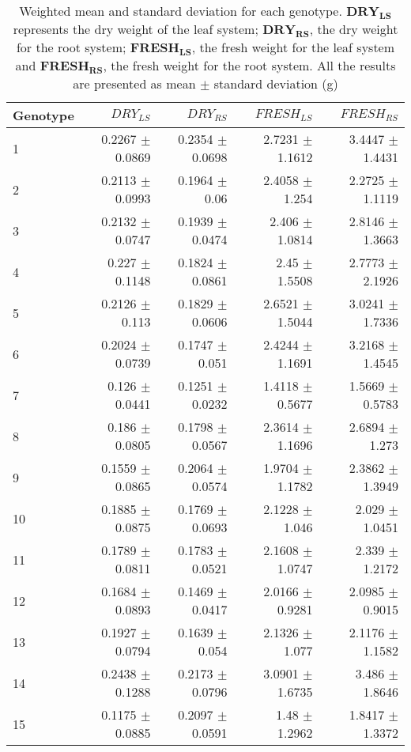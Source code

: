 \begin{table}[ht]
\centering
\caption{Weighted mean and standard deviation for each genotype. $\mathbf{DRY_{LS}}$ represents the dry weight of the leaf system; $\mathbf{DRY_{RS}}$, the dry weight for the root system; $\mathbf{FRESH_{LS}}$, the fresh weight for the leaf system and $\mathbf{FRESH_{RS}}$, the fresh weight for the root system. All the results are presented as mean $\pm$ standard deviation (g)} 
\begin{tabular}{lrrrr}
  \toprule
Genotype & $DRY_{LS}$ & $DRY_{RS}$ & $FRESH_{LS}$ & $FRESH_{RS}$ \\ 
  \midrule
1 & 0.2267 $\pm$ 0.0869 & 0.2354 $\pm$ 0.0698 & 2.7231 $\pm$ 1.1612 & 3.4447 $\pm$ 1.4431 \\ 
  2 & 0.2113 $\pm$ 0.0993 & 0.1964 $\pm$ 0.06 & 2.4058 $\pm$ 1.254 & 2.2725 $\pm$ 1.1119 \\ 
  3 & 0.2132 $\pm$ 0.0747 & 0.1939 $\pm$ 0.0474 & 2.406 $\pm$ 1.0814 & 2.8146 $\pm$ 1.3663 \\ 
  4 & 0.227 $\pm$ 0.1148 & 0.1824 $\pm$ 0.0861 & 2.45 $\pm$ 1.5508 & 2.7773 $\pm$ 2.1926 \\ 
  5 & 0.2126 $\pm$ 0.113 & 0.1829 $\pm$ 0.0606 & 2.6521 $\pm$ 1.5044 & 3.0241 $\pm$ 1.7336 \\ 
  6 & 0.2024 $\pm$ 0.0739 & 0.1747 $\pm$ 0.051 & 2.4244 $\pm$ 1.1691 & 3.2168 $\pm$ 1.4545 \\ 
  7 & 0.126 $\pm$ 0.0441 & 0.1251 $\pm$ 0.0232 & 1.4118 $\pm$ 0.5677 & 1.5669 $\pm$ 0.5783 \\ 
  8 & 0.186 $\pm$ 0.0805 & 0.1798 $\pm$ 0.0567 & 2.3614 $\pm$ 1.1696 & 2.6894 $\pm$ 1.273 \\ 
  9 & 0.1559 $\pm$ 0.0865 & 0.2064 $\pm$ 0.0574 & 1.9704 $\pm$ 1.1782 & 2.3862 $\pm$ 1.3949 \\ 
  10 & 0.1885 $\pm$ 0.0875 & 0.1769 $\pm$ 0.0693 & 2.1228 $\pm$ 1.046 & 2.029 $\pm$ 1.0451 \\ 
  11 & 0.1789 $\pm$ 0.0811 & 0.1783 $\pm$ 0.0521 & 2.1608 $\pm$ 1.0747 & 2.339 $\pm$ 1.2172 \\ 
  12 & 0.1684 $\pm$ 0.0893 & 0.1469 $\pm$ 0.0417 & 2.0166 $\pm$ 0.9281 & 2.0985 $\pm$ 0.9015 \\ 
  13 & 0.1927 $\pm$ 0.0794 & 0.1639 $\pm$ 0.054 & 2.1326 $\pm$ 1.077 & 2.1176 $\pm$ 1.1582 \\ 
  14 & 0.2438 $\pm$ 0.1288 & 0.2173 $\pm$ 0.0796 & 3.0901 $\pm$ 1.6735 & 3.486 $\pm$ 1.8646 \\ 
  15 & 0.1175 $\pm$ 0.0885 & 0.2097 $\pm$ 0.0591 & 1.48 $\pm$ 1.2962 & 1.8417 $\pm$ 1.3372 \\ 

\end{tabular}
\end{table}
